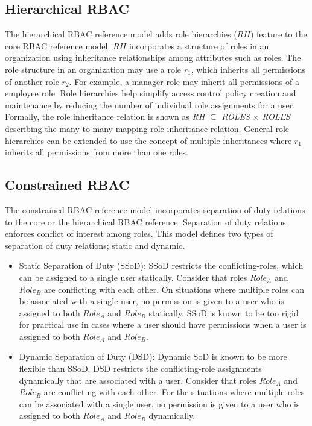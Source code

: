 \subsection{Hierarchical RBAC} 

The hierarchical RBAC reference model adds role hierarchies ($RH$) feature to the core RBAC reference model.
$RH$ incorporates a structure of roles in an organization using inheritance relationships among attributes such as roles.
The role structure in an organization may use
a role $r_1$, which inherits all permissions of another role $r_2$.
For example, a manager role may inherit all permissions of a employee role.
Role hierarchies help simplify access control policy creation and maintenance by reducing the number of
individual role assignments for a user. Formally, the role inheritance relation is shown as \textit{RH} $\subseteq$ \textit{ROLES} $\times$ \textit{ROLES} describing the many-to-many mapping role inheritance relation. 
General role hierarchies can be extended to use the concept of multiple inheritances where
$r_1$ inherits all permissions from more than one roles.


\subsection{Constrained RBAC}

The constrained RBAC reference model incorporates separation of duty relations to  the core or the hierarchical RBAC reference. Separation of 
duty relations enforces conflict of interest among roles. This model defines two types of separation of duty relations; static and dynamic.

\begin{itemize}
	\item Static Separation of Duty (SSoD): SSoD restricts the conflicting-roles, which can be assigned to a single user statically. Consider that roles $Role_A$ and $Role_B$ are conflicting with each other. On situations
	where multiple roles can be associated with a single user, no permission is given to a user who is assigned to both $Role_A$ and $Role_B$ statically. SSoD is known to be too rigid for practical use in cases where a user should have permissions when a user is assigned to both $Role_A$ and $Role_B$.
	\item Dynamic Separation of Duty (DSD): Dynamic SoD is known to be
more flexible than SSoD. DSD restricts the conflicting-role assignments dynamically that are associated with a user. Consider that roles $Role_A$ and $Role_B$ are conflicting with each other. For the situations where multiple roles can be associated with a single user, no permission is given to a user who is assigned to both $Role_A$ and $Role_B$ dynamically.	
\end{itemize}
